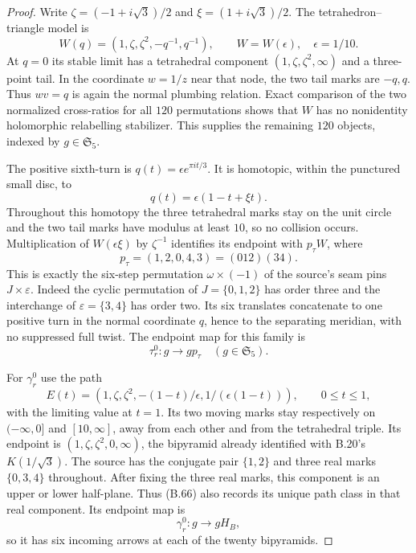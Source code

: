 \begin{proof}
Write $\zeta=(-1+i\sqrt3)/2$ and $\xi=(1+i\sqrt3)/2$.
The tetrahedron--triangle model is
\[
 W(q)=(1,\zeta,\zeta^2,-q^{-1},q^{-1}),\qquad
 W=W(\epsilon),\quad\epsilon=1/10.                \tag{B.62}
\]
At $q=0$ its stable limit has a tetrahedral component
$(1,\zeta,\zeta^2,\infty)$ and a three-point tail.
In the coordinate $w=1/z$ near that node, the two
tail marks are $-q,q$.  Thus $wv=q$ is again the normal
plumbing relation.  Exact comparison of the two normalized
cross-ratios for all $120$ permutations shows that $W$
has no nonidentity holomorphic relabelling stabilizer.
This supplies the remaining $120$ objects, indexed by
$g\in\mathfrak S_5$.

The positive sixth-turn is $q(t)=\epsilon e^{\pi it/3}$.
It is homotopic, within the punctured small disc, to
\[
 q(t)=\epsilon(1-t+\xi t).                         \tag{B.63}
\]
Throughout this homotopy the three tetrahedral marks stay
on the unit circle and the two tail marks have modulus
at least $10$, so no collision occurs.  Multiplication
of $W(\epsilon\xi)$ by $\zeta^{-1}$ identifies its endpoint
with $p_\tau W$, where
\[
 p_\tau=(1,2,0,4,3)=(012)(34).                    \tag{B.64}
\]
This is exactly the six-step permutation $\omega\times(-1)$
of the source's seam pins $J\times\varepsilon$.
Indeed the cyclic permutation of $J=\{0,1,2\}$ has
order three and the interchange of $\varepsilon=\{3,4\}$
has order two.  Its six translates concatenate to one
positive turn in the normal coordinate $q$, hence to
the separating meridian, with no suppressed full twist.
The endpoint map for this family is
\[
 \tau_r^0:g\longrightarrow gp_\tau
 \quad(g\in\mathfrak S_5).                        \tag{B.65}
\]

For $\gamma_r^0$ use the path
\[
 E(t)=(1,\zeta,\zeta^2,-(1-t)/\epsilon,
                         1/(\epsilon(1-t))),
 \qquad0\leq t\leq1,                             \tag{B.66}
\]
with the limiting value at $t=1$.  Its two moving marks
stay respectively on $(-\infty,0]$ and $[10,\infty]$,
away from each other and from the tetrahedral triple.
Its endpoint is $(1,\zeta,\zeta^2,0,\infty)$, the
bipyramid already identified with B.20's $K(1/\sqrt3)$.
The source has the conjugate pair $\{1,2\}$ and three
real marks $\{0,3,4\}$ throughout.  After fixing the
three real marks, this component is an upper or lower
half-plane.  Thus (B.66) also records its unique path
class in that real component.  Its endpoint map is
\[
 \gamma_r^0:g\longrightarrow gH_B,
                                                               \tag{B.67}
\]
so it has six incoming arrows at each of the twenty
bipyramids.


\end{proof}

